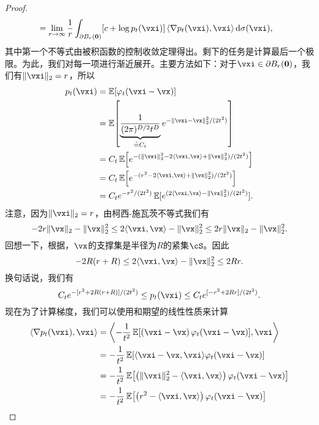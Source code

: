 \documentclass[../../book-main.tex]{subfiles}
\begin{document}
\begin{proof}
\begin{align}
        &= \lim_{r \to \infty}\frac{1}{r}\int_{\partial B_{r}(\vzero)}[c + \log p_{t}(\vxi)]\ip*{\nabla p_{t}(\vxi)}{\vxi}\odif{\sigma(\vxi)},
    \end{align}
    其中第一个不等式由被积函数的控制收敛定理得出。剩下的任务是计算最后一个极限。为此，我们对每一项进行渐近展开。主要方法如下：对于\(\vxi \in \partial B_{r}(\vzero)\)，我们有\(\norm{\vxi}_{2} = r\)，所以
    \begin{align}
        p_{t}(\vxi)
        &= \Ex[\phi_{t}(\vxi - \vx)] \\ 
        &= \Ex\rs{\underbrace{\frac{1}{(2\pi)^{D/2}t^{D}}}_{\doteq C_{t}}e^{-\|\vxi - \vx\|_{2}^{2}/(2t^{2})}} \\
        &= C_{t}\Ex\rs{e^{-(\norm{\vxi}_{2}^{2} - 2\ip{\vxi}{\vx} + \norm{\vx}_{2}^{2})/(2t^{2})}} \\ 
        &= C_{t}\Ex\rs{e^{-(r^{2} - 2\ip{\vxi}{\vx} + \norm{\vx}_{2}^{2})/(2t^{2})}} \\ 
        &= C_{t}e^{-r^{2}/(2t^{2})}\Ex[e^{(2\ip{\vxi}{\vx} - \norm{\vx}_{2}^{2})/(2t^{2})}]. 
    \end{align}
    注意，因为\(\norm{\vxi}_{2} = r\)，由柯西-施瓦茨不等式我们有
    \begin{equation}
        -2r\norm{\vx}_{2} - \norm{\vx}_{2}^{2} \leq 2\ip{\vxi}{\vx} - \norm{\vx}_{2}^{2} \leq 2r\norm{\vx}_{2} - \norm{\vx}_{2}^{2}.
    \end{equation}
    回想一下，根据，\(\vx\)的支撑集是半径为\(R\)的紧集\(\cS\)。因此
    \begin{equation}
        -2R(r + R) \leq 2\ip{\vxi}{\vx} - \norm{\vx}_{2}^{2} \leq 2Rr.
    \end{equation}
    换句话说，我们有
    \begin{equation}
        C_{t}e^{-[r^{2} + 2R(r + R)]/(2t^{2})} \leq p_{t}(\vxi) \leq C_{t}e^{[-r^{2} + 2Rr]/(2t^{2})}.
    \end{equation}
    现在为了计算梯度，我们可以使用和期望的线性性质来计算
    \begin{align}
        \ip{\nabla p_{t}(\vxi)}{\vxi}
        &= \ip*{-\frac{1}{t^{2}}\Ex\rs{\bp{\vxi - \vx}\phi_{t}(\vxi - \vx)}}{\vxi} \\
        &= -\frac{1}{t^{2}}\Ex\rs{\ip{\vxi - \vx}{\vxi}\phi_{t}(\vxi - \vx)} \\
        &= -\frac{1}{t^{2}}\Ex\rs{\bp{\norm{\vxi}_{2}^{2} - \ip{\vxi}{\vx}}\phi_{t}(\vxi - \vx)} \\
        &= -\frac{1}{t^{2}}\Ex\rs{\bp{r^{2} - \ip{\vxi}{\vx}}\phi_{t}(\vxi - \vx)} \\

\end{align}
\end{proof}
\end{document}
